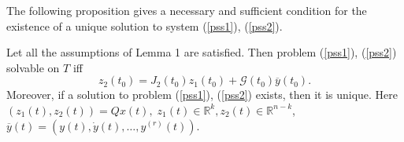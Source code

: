 \documentclass[12pt]{llncs}
\begin{document}
The following proposition gives a necessary and sufficient condition for the existence of a unique solution to system (\ref{pss1}), (\ref{pss2}). %
\begin{theorem}
Let all the assumptions of Lemma 1 are satisfied. 
Then problem (\ref{pss1}), (\ref{pss2}) solvable on $T$ iff
\begin{equation}\label{pss55}
z_2(t_0) = 
J_2(t_0)z_1(t_0) + {\mathcal{G}(t_0)}\overline{y}(t_0).
\end{equation}
Moreover, if a solution to problem (\ref{pss1}), (\ref{pss2}) exists, then it is unique. Here
$(z_1(t), z_2(t)) = Qx(t), \; z_1(t) \in {\mathbb R}^k, z_2(t) \in {\mathbb R}^{n-k}$, $\overline{y}(t) = (y(t), \dot{y}(t), \ldots, y^{(r)}(t))$.
\end{theorem} 


%


\end{document}
